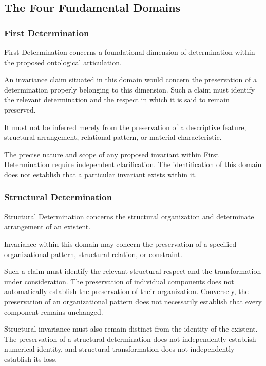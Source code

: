 \subsection{The Four Fundamental Domains}

\subsubsection{First Determination}

First Determination concerns a foundational
dimension of determination within the proposed
ontological articulation.

An invariance claim situated in this domain
would concern the preservation of a determination
properly belonging to this dimension. Such a
claim must identify the relevant determination
and the respect in which it is said to remain
preserved.

It must not be inferred merely from the
preservation of a descriptive feature,
structural arrangement, relational pattern,
or material characteristic.

The precise nature and scope of any proposed
invariant within First Determination require
independent clarification. The identification
of this domain does not establish that a
particular invariant exists within it.

\subsubsection{Structural Determination}

Structural Determination concerns the structural
organization and determinate arrangement of
an existent.

Invariance within this domain may concern
the preservation of a specified organizational
pattern, structural relation, or constraint.

Such a claim must identify the relevant
structural respect and the transformation
under consideration. The preservation of
individual components does not automatically
establish the preservation of their organization.
Conversely, the preservation of an organizational
pattern does not necessarily establish that
every component remains unchanged.

Structural invariance must also remain distinct
from the identity of the existent. The preservation
of a structural determination does not independently
establish numerical identity, and structural
transformation does not independently establish
its loss.

